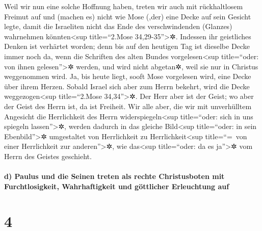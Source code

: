  Weil wir nun eine solche Hoffnung haben, treten wir auch
mit rückhaltlosem Freimut auf  und (machen es) nicht wie
Mose (,der) eine Decke auf sein Gesicht legte, damit die Israeliten
nicht das Ende des verschwindenden (Glanzes) wahrnehmen
könnten\textless sup title=``2.Mose 34,29-35''\textgreater✲.
 Indessen ihr geistliches Denken ist verhärtet worden;
denn bis auf den heutigen Tag ist dieselbe Decke immer noch da, wenn die
Schriften des alten Bundes vorgelesen\textless sup title=``oder: von
ihnen gelesen''\textgreater✲ werden, und wird nicht abgetan✲, weil sie
nur in Christus weggenommen wird.  Ja, bis heute liegt,
sooft Mose vorgelesen wird, eine Decke über ihrem Herzen.
 Sobald Israel sich aber zum Herrn bekehrt, wird die
Decke weggezogen\textless sup title=``2.Mose 34,34''\textgreater✲.
 Der Herr aber ist der Geist; wo aber der Geist des Herrn
ist, da ist Freiheit.  Wir alle aber, die wir mit
unverhülltem Angesicht die Herrlichkeit des Herrn
widerspiegeln\textless sup title=``oder: sich in uns spiegeln
lassen''\textgreater✲, werden dadurch in das gleiche Bild\textless sup
title=``oder: in sein Ebenbild''\textgreater✲ umgestaltet von
Herrlichkeit zu Herrlichkeit\textless sup title=``=~von einer
Herrlichkeit zur anderen''\textgreater✲, wie das\textless sup
title=``oder: da es ja''\textgreater✲ vom Herrn des Geistes geschieht.

\hypertarget{d-paulus-und-die-seinen-treten-als-rechte-christusboten-mit-furchtlosigkeit-wahrhaftigkeit-und-guxf6ttlicher-erleuchtung-auf}{%
\paragraph{d) Paulus und die Seinen treten als rechte Christusboten mit
Furchtlosigkeit, Wahrhaftigkeit und göttlicher Erleuchtung
auf}\label{d-paulus-und-die-seinen-treten-als-rechte-christusboten-mit-furchtlosigkeit-wahrhaftigkeit-und-guxf6ttlicher-erleuchtung-auf}}

\hypertarget{section-3}{%
\section{4}\label{section-3}}

